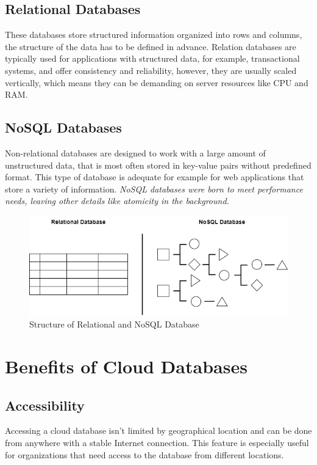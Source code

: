 \documentclass[12pt, a4paper]{article}
\begin{document}
    \subsection{Relational Databases}
        These databases store structured information organized into rows and columns, the structure of the data has to be defined in advance. Relation databases are typically used for applications with structured data, for example, transactional systems, and offer consistency and reliability, however, they are usually scaled vertically, which means they can be demanding on server resources like CPU and RAM.

    \subsection{NoSQL Databases}
        Non-relational databases are designed to work with a large amount of unstructured data, that is most often stored in key-value pairs without predefined format. This type of database is adequate for example for web applications that store a variety of information. \textit{NoSQL databases were born to meet performance needs, leaving other details like atomicity in the background.}\cite{06}\\
        \begin{figure}[h]
            \centering
            \includegraphics[width=1\linewidth]{images/relational-nosql.png}
            \caption{Structure of Relational and NoSQL Database}
            \label{fig:structure}
        \end{figure}
\clearpage

\section{Benefits of Cloud Databases}
    \subsection{Accessibility}
        Accessing a cloud database isn't limited by geographical location and can be done from anywhere with a stable Internet connection. This feature is especially useful for organizations that need access to the database from different locations.
    
\end{document}
